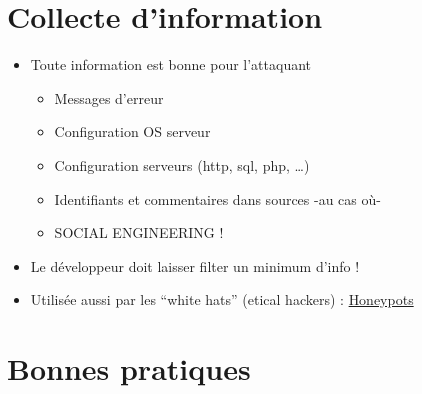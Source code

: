 \hypertarget{collecte-dinformation}{%
\section{Collecte d'information}\label{collecte-dinformation}}

\begin{itemize}
\tightlist
\item
  Toute information est bonne pour l'attaquant

  \begin{itemize}
  \tightlist
  \item
    Messages d'erreur
  \item
    Configuration OS serveur
  \item
    Configuration serveurs (http, sql, php, \ldots)
  \item
    Identifiants et commentaires dans sources -au cas où-
  \item
    SOCIAL ENGINEERING !
  \end{itemize}
\item
  Le développeur doit laisser filter un minimum d'info !
\item
  Utilisée aussi par les ``white hats'' (etical hackers) :
  \href{https://hackertarget.com/cowrie-honeypot-analysis-24hrs/}{Honeypots}
\end{itemize}

\hypertarget{bonnes-pratiques}{%
\section{Bonnes pratiques}\label{bonnes-pratiques}}

